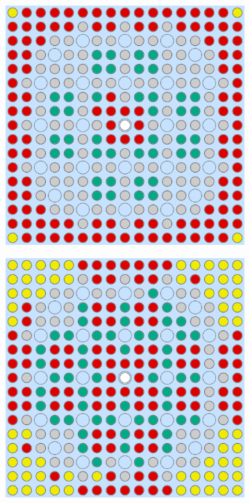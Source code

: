 \begin{appendices}
\begin{figure}[h!]
\begin{subfigure}{0.48\textwidth}
  \caption{}
  \label{fig:assm-16-combined-pca-2}
\end{subfigure}
\begin{subfigure}{0.48\textwidth}
  \centering
  \includegraphics[width=0.95\linewidth]{figures/unsupervised/geometries/dimension-reduce/assm-16/ica}
  \caption{}
  \label{fig:assm-16-combined-ica-2}
\end{subfigure}%
\begin{subfigure}{0.48\textwidth}
  \centering
  \includegraphics[width=0.95\linewidth]{figures/unsupervised/geometries/dimension-reduce/assm-16/factor-analysis}

\end{subfigure}
\end{figure}
\end{appendices}

